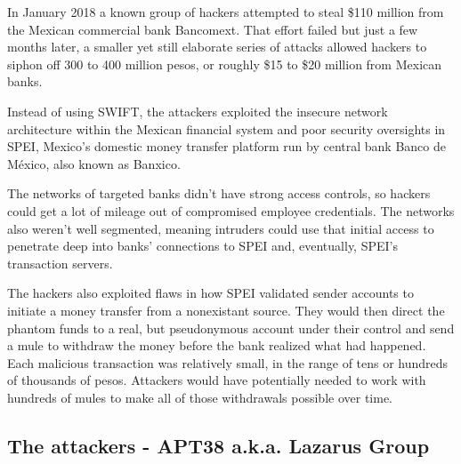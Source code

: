\documentclass[12pt]{article}
\begin{document}
        In January 2018 a known group of hackers attempted to steal \$110 million from the Mexican commercial bank Bancomext. That effort failed but just a few months later, a smaller yet still elaborate series of attacks allowed hackers to siphon off 300 to 400 million pesos, or roughly \$15 to \$20 million from Mexican banks.
        
        Instead of using SWIFT, the attackers exploited the insecure network architecture within the Mexican financial system and poor security oversights in SPEI, Mexico's domestic money transfer platform run by central bank Banco de México, also known as Banxico. 
        
        The networks of targeted banks didn't have strong access controls, so hackers could get a lot of mileage out of compromised employee credentials. The networks also weren't well segmented, meaning intruders could use that initial access to penetrate deep into banks' connections to SPEI and, eventually, SPEI's transaction servers. 
        
        The hackers also exploited flaws in how SPEI validated sender accounts to initiate a money transfer from a nonexistant source. They would then direct the phantom funds to a real, but pseudonymous account under their control and send a mule to withdraw the money before the bank realized what had happened. Each malicious transaction was relatively small, in the range of tens or hundreds of thousands of pesos. Attackers would have potentially needed to work with hundreds of mules to make all of those withdrawals possible over time.\cite{HowHackersPulled}
    
    \subsection{The attackers - APT38 a.k.a. Lazarus Group}
        
\end{document}
